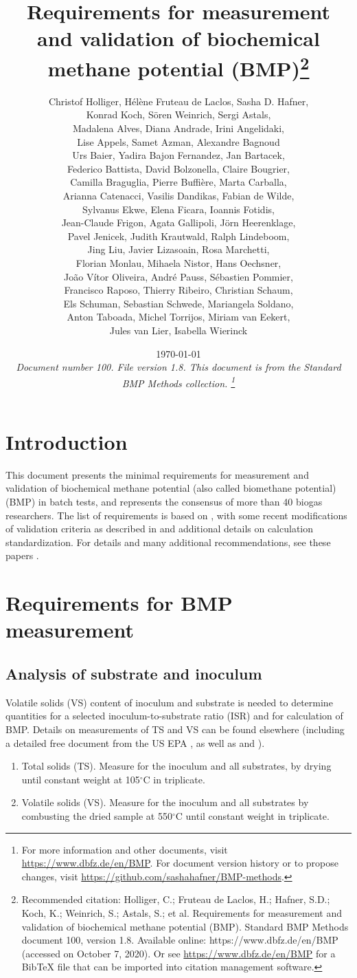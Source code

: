\documentclass[]{article}
\title {Requirements for measurement and validation of biochemical methane potential (BMP)\footnote{
  Recommended citation: 
Holliger, C.; Fruteau de Laclos, H.; Hafner, S.D.; Koch, K.; Weinrich, S.; Astals, S.; et al. Requirements for measurement and validation of biochemical methane potential (BMP). Standard BMP Methods document 100, version 1.8. Available online: https://www.dbfz.de/en/BMP (accessed on October 7, 2020).
\newline
  Or see \url{https://www.dbfz.de/en/BMP} for a BibTeX file that can be imported into citation management software.
}}
\author{
Christof Holliger, 
H{\'e}l{\`e}ne Fruteau de Laclos,
Sasha D. Hafner,\\
Konrad Koch,
S{\"o}ren Weinrich,
Sergi Astals, \\
Madalena Alves, 
Diana Andrade,
Irini Angelidaki,\\
Lise Appels,
Samet Azman,
Alexandre Bagnoud \\
Urs Baier,
Yadira Bajon Fernandez,
Jan Bartacek,\\
Federico Battista,
David Bolzonella,
Claire Bougrier,\\
Camilla Braguglia,
Pierre Buffi{\`e}re,
Marta Carballa,\\
Arianna Catenacci,
Vasilis Dandikas,
Fabian de Wilde,\\
Sylvanus Ekwe,
Elena Ficara,
Ioannis Fotidis,\\
Jean-Claude Frigon,
Agata Gallipoli,
J{\"o}rn Heerenklage,\\
Pavel Jenicek,
Judith Krautwald,
Ralph Lindeboom,\\
Jing Liu,
Javier Lizasoain,
Rosa Marchetti,\\
Florian Monlau,
Mihaela Nistor,
Hans Oechsner,\\
Jo{\~a}o V{\'i}tor Oliveira,
Andr{\'e} Pauss,
S{\'e}bastien Pommier,\\
Francisco Raposo,
Thierry Ribeiro,
Christian Schaum,\\
Els Schuman,
Sebastian Schwede,
Mariangela Soldano,\\
Anton Taboada,
Michel Torrijos,
Miriam van Eekert,\\
Jules van Lier, 
Isabella Wierinck\\
}
\date{\today \\
\bigskip
\textit{
  Document number 100.
  File version 1.8. 
  This document is from the Standard BMP Methods collection.
    \footnote{For more information and other documents, visit \url{https://www.dbfz.de/en/BMP}. 
    For document version history or to propose changes, visit \url{https://github.com/sashahafner/BMP-methods}.}
}
}
\begin{document}
\maketitle

\section{Introduction}
This document presents the minimal requirements for measurement and validation of biochemical methane potential (also called biomethane potential) (BMP) in batch tests, and represents the consensus of more than 40 biogas researchers.
The list of requirements is based on \citet{holligerStandardizationBiomethanePotential2016}, with some recent modifications of validation criteria as described in \citet{hafnerImprovingInterlaboratoryReproducibility2020} and additional details on calculation standardization.
For details and many additional recommendations, see these papers \citep{holligerStandardizationBiomethanePotential2016,hafnerImprovingInterlaboratoryReproducibility2020}.

\section{Requirements for BMP measurement}
\label{sec:requirements}
\subsection{Analysis of substrate and inoculum}
\label{sec:analysis}
  Volatile solids (VS) content of inoculum and substrate is needed to determine quantities for a selected inoculum-to-substrate ratio (ISR) and for calculation of BMP.
   Details on measurements of TS and VS can be found elsewhere (including a detailed free document from the US EPA \citep{epaMethod1684Total2001}, as well as \citet{strachDeterminationTotalSolids2016} and \citet{bairdStandardMethodsExamination2017}). 

  \begin{enumerate}
    \item Total solids (TS). Measure for the inoculum and all substrates, by drying until constant weight at 105$^\circ$C in triplicate.
    \item Volatile solids (VS). Measure for the inoculum and all substrates by combusting the dried sample at 550$^\circ$C until constant weight in triplicate.
  \end{enumerate}
\end{document}
